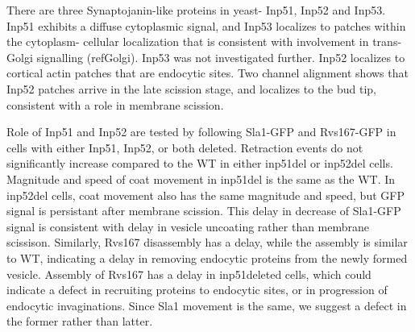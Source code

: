 \documentclass[9pt,lineno]{elife}
\begin{document}
There are three Synaptojanin-like proteins in yeast- Inp51, Inp52 and Inp53. Inp51 exhibits a diffuse cytoplasmic signal, and Inp53 localizes to patches within the cytoplasm- cellular localization that is consistent with involvement in trans-Golgi signalling (refGolgi). Inp53 was not investigated further. Inp52 localizes to cortical actin patches that are endocytic sites. Two channel alignment shows that Inp52 patches arrive in the late scission stage, and localizes to the bud tip, consistent with a role in membrane scission. 

Role of Inp51 and Inp52 are tested by following Sla1-GFP and Rvs167-GFP in cells with either Inp51, Inp52, or both deleted. Retraction events do not significantly increase compared to the WT in either inp51del or inp52del cells. Magnitude and speed of coat movement in inp51del is the same as the WT. In inp52del cells, coat movement also has the same magnitude and speed, but GFP signal is persistant after membrane scission. This delay in decrease of Sla1-GFP signal is consistent with delay in vesicle uncoating rather than membrane scissison. Similarly, Rvs167 disassembly has a delay, while the assembly is similar to WT, indicating a delay in removing endocytic proteins from the newly formed vesicle. Assembly of Rvs167 has a delay in inp51deleted cells, which could indicate a defect in recruiting proteins to endocytic sites, or in progression of endocytic invaginations. Since Sla1 movement is the same, we suggest a defect in the former rather than latter. 



\end{document}
